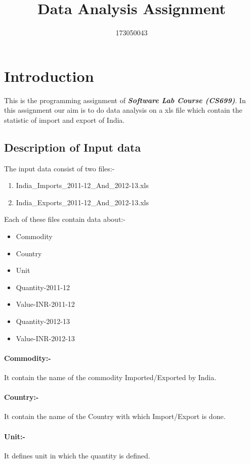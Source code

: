 \documentclass[a4paper,11pt]{article}
\title{\huge Data Analysis Assignment \\ \hrulefill}
\author{173050043 }
\begin{document}
\maketitle		%

\section{Introduction}
\label{sec:int}
{\fontsize{10}{20}\selectfont		%
This is the programming assignment of \textbf{\textit{Software Lab Course (CS699)}}. In this assignment our aim is to do data analysis on a xls file which contain the statistic of import and export of India.}
\subsection{Description of Input data}
The input data consist of two files:-
\begin{enumerate}						%
\item India\_Imports\_2011-12\_And\_2012-13.xls
\item India\_Exports\_2011-12\_And\_2012-13.xls
\end{enumerate}

Each of these files contain data about:-
\begin{itemize}						%
\item  Commodity
\item  Country
\item  Unit
\item  Quantity-2011-12
\item  Value-INR-2011-12
\item  Quantity-2012-13
\item  Value-INR-2012-13
\end{itemize}
\paragraph{Commodity:-} It contain the name of the commodity Imported/Exported by India.
\paragraph{Country:-} It contain the name of the Country with which Import/Export  is done.
\paragraph{Unit:-} It  defines unit in which the quantity is defined.
\end{document}
